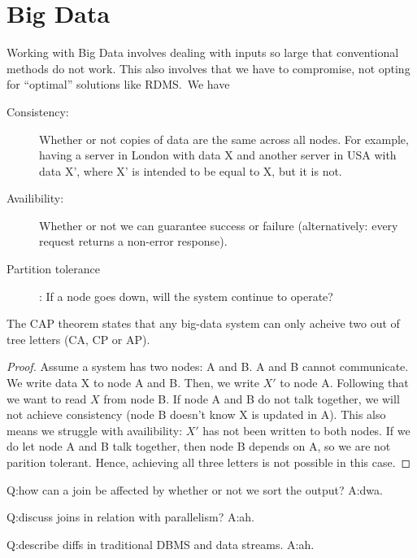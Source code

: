 \section{Big Data}
\begin{definition}\label{def:captheorem}
    Working with Big Data involves dealing with inputs so large that conventional methods do not work.
    This also involves that we have to compromise, not opting for ``optimal'' solutions like RDMS.\
    We have 
    \begin{description}
        \item[Consistency:] Whether or not copies of data are the same across all nodes.
        For example, having a server in London with data X and another server in USA with data X', where X' is intended to be equal to X, but it is not.
        \item[Availibility:] Whether or not we can guarantee success or failure (alternatively: every request returns a non-error response).
        \item[Partition tolerance]:  If a node goes down, will the system continue to operate?
    \end{description}

    The CAP theorem states that any big-data system can only acheive two out of tree letters (CA, CP or AP).
\end{definition}

\begin{proof}
Assume a system has two nodes: A and B. A and B cannot communicate.
We write data X to node A and B. Then, we write $X'$ to node A. Following that we want to read $X$ from node B.
If node A and B do not talk together, we will not achieve consistency (node B doesn't know X is updated in A).
This also means we struggle with availibility: $X'$ has not been written to both nodes.
If we do let node A and B talk together, then node B depends on A, so we are not parition tolerant.
Hence, achieving all three letters is not possible in this case.
\end{proof}

Q:\@ how can a join be affected by whether or not we sort the output?
\newline A:\@ dwa.

Q:\@ discuss joins in relation with parallelism?
\newline A:\@ ah. 

Q:\@ describe diffs in traditional DBMS and data streams.
\newline A:\@ ah. 

